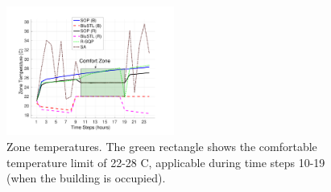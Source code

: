 \begin{figure}[t]
\centering
\includegraphics[width=0.49\textwidth]{figures/ZoneTempFinal}
\vspace{-20pt}
\caption{\small{Zone temperatures. The green rectangle shows the comfortable temperature limit of 22-28 C, applicable during time steps 10-19 (when the building is occupied).}}
\label{fig:ZoneTemp}
\vspace{-10pt}
\end{figure}






